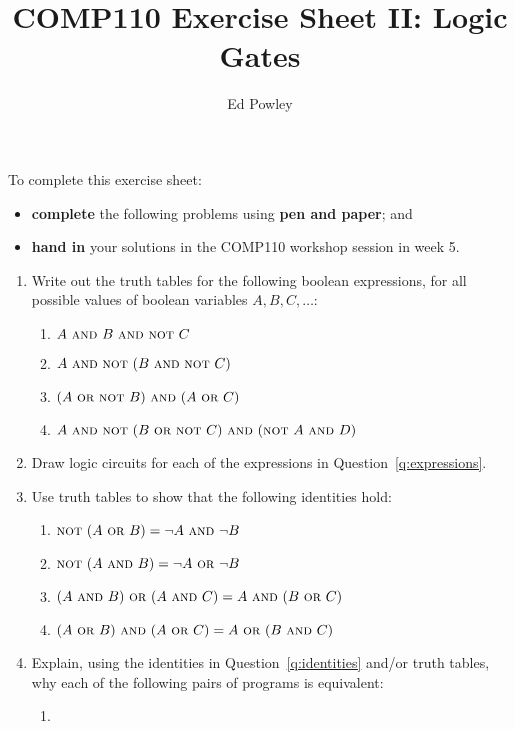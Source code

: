 \documentclass{../../../fal_assignment}
\title{COMP110 Exercise Sheet II: Logic Gates}
\author{Ed Powley}
\newcommand{\OP}[1]{\ \textsc{#1}\ }
\newcommand{\OPand}{\OP{and}}
\newcommand{\OPor}{\OP{or}}
\newcommand{\OPnot}{\textsc{not}\ }
\begin{document}
\maketitle

To complete this exercise sheet:
\begin{itemize}
    \item \textbf{complete} the following problems using \textbf{pen and paper}; and
    \item \textbf{hand in} your solutions in the COMP110 workshop session in week 5.
\end{itemize}

\begin{enumerate}
    \item \label{q:expressions} Write out the truth tables for the following boolean expressions, for all possible values of boolean variables
        $A, B, C, \dots$:
        \begin{enumerate}
            \item $A \OPand B \OPand \OPnot C$
            \item $A \OPand \OPnot(B \OPand \OPnot C)$
            \item $(A \OPor \OPnot B) \OPand (A \OPor C)$
            \item $A \OPand \OPnot (B \OPor \OPnot C) \OPand (\OPnot A \OPand D)$
        \end{enumerate}
    \item Draw logic circuits for each of the expressions in Question~\ref{q:expressions}.
    \item \label{q:identities} Use truth tables to show that the following identities hold:
        \begin{enumerate}
            \item $\OPnot (A \OPor B) = \neg A \OPand \neg B$
            \item $\OPnot (A \OPand B) = \neg A \OPor \neg B$
            \item $(A \OPand B) \OPor (A \OPand C) = A \OPand (B \OPor C)$
            \item $(A \OPor B) \OPand (A \OPor C) = A \OPor (B \OPand C)$
        \end{enumerate}
    \item Explain, using the identities in Question~\ref{q:identities} and/or truth tables,    
        why each of the following pairs of programs is equivalent:
        \begin{enumerate}
            \item {\ }

\end{enumerate}
\end{enumerate}
\end{document}
